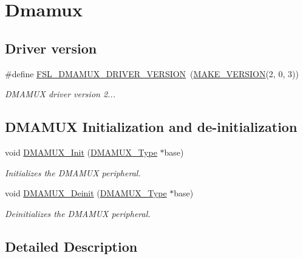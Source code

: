\hypertarget{group__dmamux}{}\section{Dmamux}
\label{group__dmamux}
\subsection*{Driver version}
\begin{DoxyCompactItemize}
\item 
\mbox{\label{group__dmamux_ga52b927e4f978ddf42faf0acf6de3df57}} 
\#define \mbox{\hyperlink{group__dmamux_ga52b927e4f978ddf42faf0acf6de3df57}{F\+S\+L\+\_\+\+D\+M\+A\+M\+U\+X\+\_\+\+D\+R\+I\+V\+E\+R\+\_\+\+V\+E\+R\+S\+I\+ON}}~(\mbox{\hyperlink{group__ftfx__utilities_ga812138aa3315b0c6953c1a26130bcc37}{M\+A\+K\+E\+\_\+\+V\+E\+R\+S\+I\+ON}}(2, 0, 3))
\begin{DoxyCompactList}\small\item\em D\+M\+A\+M\+UX driver version 2... \end{DoxyCompactList}\end{DoxyCompactItemize}
\subsection*{D\+M\+A\+M\+UX Initialization and de-\/initialization}
\begin{DoxyCompactItemize}
\item 
void \mbox{\hyperlink{group__dmamux_ga850545ac61a004df8ca312db2ca9db73}{D\+M\+A\+M\+U\+X\+\_\+\+Init}} (\mbox{\hyperlink{struct_d_m_a_m_u_x___type}{D\+M\+A\+M\+U\+X\+\_\+\+Type}} $\ast$base)
\begin{DoxyCompactList}\small\item\em Initializes the D\+M\+A\+M\+UX peripheral. \end{DoxyCompactList}\item 
void \mbox{\hyperlink{group__dmamux_gab663257d094b9b7b6fa1b894fbf8000b}{D\+M\+A\+M\+U\+X\+\_\+\+Deinit}} (\mbox{\hyperlink{struct_d_m_a_m_u_x___type}{D\+M\+A\+M\+U\+X\+\_\+\+Type}} $\ast$base)
\begin{DoxyCompactList}\small\item\em Deinitializes the D\+M\+A\+M\+UX peripheral. \end{DoxyCompactList}\end{DoxyCompactItemize}


\subsection{Detailed Description}


